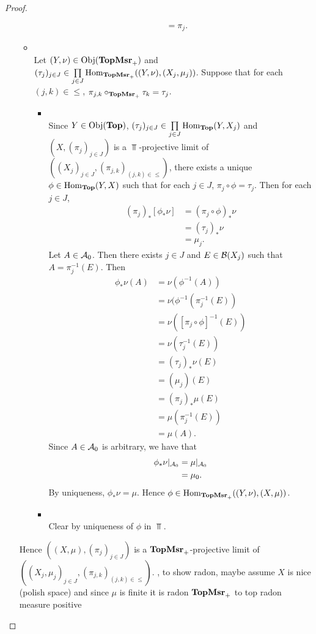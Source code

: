 \documentclass{book}
\begin{document}
\begin{proof}
\begin{enumerate}
\begin{itemize}
\begin{align*}
				& = \pi_j.
			\end{align*}
			\item {} \\
			Let $(Y, \nu) \in \operatorname{Obj}(\operatorname*{\text{\textbf{TopMsr}}_{+}})$ and $(\tau_j)_{j \in J} \in \prod\limits_{j \in J} \operatorname{Hom}_{\operatorname*{\text{\textbf{TopMsr}}_{+}}}((Y, \nu),(X_j, \mu_j))$. Suppose that for each $(j,k) \in {\leq}$, $\pi_{j,k} \circ_{\operatorname*{\text{\textbf{TopMsr}}_{+}}} \tau_k = \tau_j$. 
			\begin{itemize}
				\item {} \\
				Since $Y \in \operatorname{Obj}(\operatorname*{\text{\textbf{Top}}})$, $(\tau_j)_{j \in J} \in \prod\limits_{j \in J} \operatorname{Hom}_{\operatorname*{\text{\textbf{Top}}}}(Y,X_j)$ and $(X, (\pi_j)_{j \in J})$ is a $\Top$-projective limit of $((X_j)_{j \in J}, (\pi_{j,k})_{(j,k) \in {\leq}})$, there exists a unique $\phi \in \operatorname{Hom}_{\operatorname*{\text{\textbf{Top}}}}(Y, X)$ such that for each $j \in J$, $\pi_j \circ \phi = \tau_j$. Then for each $j \in J$,
				\begin{align*}
					(\pi_j)_*[\phi_*\nu]
					& = (\pi_j \circ \phi)_*\nu \\
					& = (\tau_j)_*\nu \\
					& = \mu_j.  
				\end{align*}
				Let $A \in \mathcal{A}_0$. Then there exists $j \in J$ and $E \in \mathcal{B}(X_j)$ such that $A = \pi_{j}^{-1}(E)$. Then
				\begin{align*}
					\phi_*\nu(A)
					& = \nu(\phi^{-1}(A)) \\
					& = \nu(\phi^{-1}(\pi_j^{-1}(E)) \\
					& = \nu([\pi_j \circ \phi]^{-1}(E)) \\
					& = \nu(\tau_j^{-1}(E)) \\
					& = (\tau_j)_*\nu(E) \\
					& = (\mu_j)(E) \\
					& = (\pi_j)_*\mu(E) \\
					& = \mu(\pi_j^{-1}(E)) \\
					& = \mu(A).
				\end{align*}
				Since $A \in \mathcal{A}_0$ is arbitrary, we have that 
				\begin{align*}
					\phi_*\nu|_{\mathcal{A}_0}
					& = \mu|_{\mathcal{A}_0} \\
					& = \mu_0. 
				\end{align*}
				By uniqueness, $\phi_*\nu = \mu$. Hence $\phi \in \operatorname{Hom}_{\operatorname*{\text{\textbf{TopMsr}}_{+}}}((Y, \nu), (X, \mu))$.
				\item {} \\
				Clear by uniqueness of $\phi$ in $\Top$. 
			\end{itemize}
		\end{itemize}
		Hence $((X, \mu), (\pi_j)_{j \in J})$ is a $\operatorname*{\text{\textbf{TopMsr}}_{+}}$-projective limit of $((X_j, \mu_j)_{j \in J}, (\pi_{j,k})_{(j,k) \in {\leq}})$.
		, to show radon, maybe assume $X$ is nice (polish space) and since $\mu$ is finite it is radon
		 $\operatorname*{\text{\textbf{TopMsr}}_{+}}$ to top radon measure positive
	\end{enumerate}
\end{proof}
	
\end{document}
